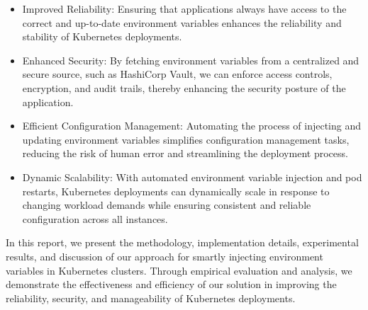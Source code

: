 \begin{itemize}
    \item Improved Reliability: Ensuring that applications always have access to the correct and up-to-date environment variables enhances the reliability and stability of Kubernetes deployments.
    
    \item Enhanced Security: By fetching environment variables from a centralized and secure source, such as HashiCorp Vault, we can enforce access controls, encryption, and audit trails, thereby enhancing the security posture of the application.
    
    \item Efficient Configuration Management: Automating the process of injecting and updating environment variables simplifies configuration management tasks, reducing the risk of human error and streamlining the deployment process.
    
    \item Dynamic Scalability: With automated environment variable injection and pod restarts, Kubernetes deployments can dynamically scale in response to changing workload demands while ensuring consistent and reliable configuration across all instances.
\end{itemize}

In this report, we present the methodology, implementation details, experimental results, and discussion of our approach for smartly injecting environment variables in Kubernetes clusters. Through empirical evaluation and analysis, we demonstrate the effectiveness and efficiency of our solution in improving the reliability, security, and manageability of Kubernetes deployments.


